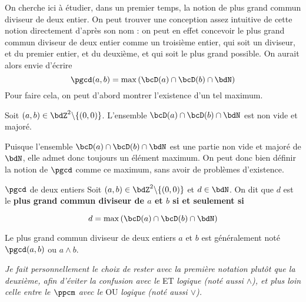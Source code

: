 \documentclass[a4paper,french,bookmarks]{article}
\begin{document}
\qquad On cherche ici à étudier, dans un premier temps, la notion de plus grand commun diviseur de deux entier. On peut trouver une conception assez intuitive de cette notion directement d'après son nom : on peut en effet concevoir le plus grand commun diviseur de deux entier comme un troisième entier, qui soit un diviseur, et du premier entier, et du deuxième, et qui soit le plus grand possible. On aurait alors envie d'écrire 
\[ \pgcd(a, b) = \max \left(\bcD(a) \cap \bcD(b) \cap \bdN\right)\]
Pour faire cela, on peut d'abord montrer l'existence d'un tel maximum.
\begin{property}{}{}
    Soit $(a, b) \in \bdZ^2 \backslash \{(0, 0)\}$. L'ensemble $\bcD(a) \cap \bcD(b) \cap \bdN$ est non vide et majoré.
\end{property}


Puisque l'ensemble $\bcD(a) \cap \bcD(b) \cap \bdN$ est une partie non vide et majoré de $\bdN$, elle admet donc toujours un élément maximum. On peut donc bien définir la notion de $\pgcd$ comme ce maximum, sans avoir de problèmes d'existence.

\begin{definition}{$\pgcd$ de deux entiers}{}
    Soit $(a, b) \in \bdZ^2 \backslash \{(0, 0)\}$ et $d \in \bdN$. On dit que $d$ est le \bf{plus grand commun diviseur de $a$ et $b$} si et seulement si
    
    \[ d = \max \left(\bcD(a) \cap \bcD(b) \cap \bdN\right)\]
\end{definition}

Le plus grand commun diviseur de deux entiers $a$ et $b$ est généralement noté $\pgcd(a, b)$ ou $a \wedge b$.

\begin{center}
    \begin{minipage}{0.8\linewidth}
    
        \begin{small}
            \textit{Je fait personnellement le choix de rester avec la première notation plutôt que la deuxième, afin d'éviter la confusion avec le} ET \textit{logique (noté aussi $\land$), et plus loin celle entre le  $\ppcm$ avec le} OU \textit{logique (noté aussi $\lor$).}
        \end{small}
    
    \end{minipage}
    
\end{center}
\end{document}
